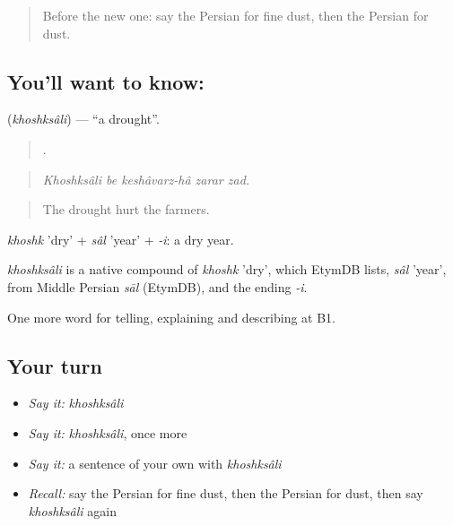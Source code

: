 \label{lesson:FA-C478-khoshksali}



\begin{quote}
Before the new one: say the Persian for fine dust, then the Persian for dust.
\end{quote}

\subsection*{You'll want to know: }
\textbf{} (\emph{khoshksâli}) — \textquotedblleft{}a drought\textquotedblright{}.

\begin{quote}
    .
\end{quote}

\begin{quote}
\emph{Khoshksâli be keshâvarz-hâ zarar zad.}
\end{quote}

\begin{quote}
The drought hurt the farmers.
\end{quote}

\emph{khoshk} 'dry' + \emph{sâl} 'year' + \emph{-i}: a dry year.

\begin{cousinweb}
\emph{khoshksâli} is a native compound of \emph{khoshk} 'dry', which EtymDB lists, \emph{sâl} 'year', from Middle Persian \emph{sāl} (EtymDB), and the ending \emph{-i}.
\end{cousinweb}

\begin{grammarlens}[title={What you've built}]
One more word for telling, explaining and describing at B1.
\end{grammarlens}

\subsection*{Your turn}
\begin{itemize}
\raggedright
  \item \emph{Say it:} \emph{khoshksâli}
  \item \emph{Say it:} \emph{khoshksâli}, once more
  \item \emph{Say it:} a sentence of your own with \emph{khoshksâli}
  \item \emph{Recall:} say the Persian for fine dust, then the Persian for dust, then say \emph{khoshksâli} again
\end{itemize}

